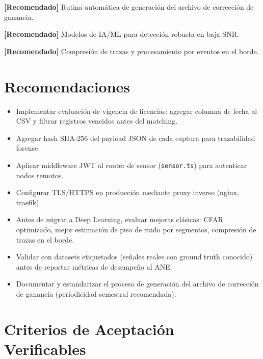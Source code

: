 \textbf{[Recomendado]} Rutina automática de generación del archivo de corrección de ganancia.

\textbf{[Recomendado]} Modelos de IA/ML para detección robusta en baja SNR.

\textbf{[Recomendado]} Compresión de trazas y procesamiento por eventos en el borde.

\section{Recomendaciones}

\begin{itemize}
\item Implementar evaluación de vigencia de licencias: agregar columna de fecha al CSV y filtrar registros vencidos antes del matching.
\item Agregar hash SHA-256 del payload JSON de cada captura para trazabilidad forense.
\item Aplicar middleware JWT al router de sensor (\texttt{sensor.ts}) para autenticar nodos remotos.
\item Configurar TLS/HTTPS en producción mediante proxy inverso (nginx, traefik).
\item Antes de migrar a Deep Learning, evaluar mejoras clásicas: CFAR optimizado, mejor estimación de piso de ruido por segmentos, compresión de trazas en el borde.
\item Validar con datasets etiquetados (señales reales con ground truth conocido) antes de reportar métricas de desempeño al ANE.
\item Documentar y estandarizar el proceso de generación del archivo de corrección de ganancia (periodicidad semestral recomendada).
\end{itemize}

\section{Criterios de Aceptación Verificables}

